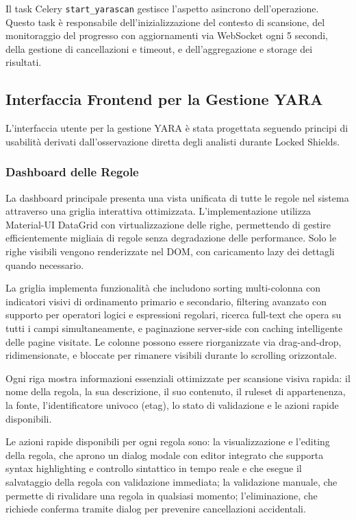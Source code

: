 Il task Celery \texttt{start\_yarascan} gestisce l'aspetto asincrono dell'operazione. Questo task è responsabile dell'inizializzazione del contesto di scansione, del monitoraggio del progresso con aggiornamenti via WebSocket ogni 5 secondi, della gestione di cancellazioni e timeout, e dell'aggregazione e storage dei risultati.

\subsection{Interfaccia Frontend per la Gestione YARA}

L'interfaccia utente per la gestione YARA è stata progettata seguendo principi di usabilità derivati dall'osservazione diretta degli analisti durante Locked Shields.

\subsubsection{Dashboard delle Regole}

La dashboard principale presenta una vista unificata di tutte le regole nel sistema attraverso una griglia interattiva ottimizzata. L'implementazione utilizza Material-UI DataGrid con virtualizzazione delle righe, permettendo di gestire efficientemente migliaia di regole senza degradazione delle performance. Solo le righe visibili vengono renderizzate nel DOM, con caricamento lazy dei dettagli quando necessario.

La griglia implementa funzionalità che includono sorting multi-colonna con indicatori visivi di ordinamento primario e secondario, filtering avanzato con supporto per operatori logici e espressioni regolari, ricerca full-text che opera su tutti i campi simultaneamente, e paginazione server-side con caching intelligente delle pagine visitate. Le colonne possono essere riorganizzate via drag-and-drop, ridimensionate, e bloccate per rimanere visibili durante lo scrolling orizzontale.

Ogni riga mostra informazioni essenziali ottimizzate per scansione visiva rapida: il nome della regola, la sua descrizione, il suo contenuto, il ruleset di appartenenza, la fonte, l'identificatore univoco (etag), lo stato di validazione e le azioni rapide disponibili.

Le azioni rapide disponibili per ogni regola sono: la visualizzazione e l'editing della regola, che aprono un dialog modale con editor integrato che supporta syntax highlighting e controllo sintattico in tempo reale e che esegue il salvataggio della regola con validazione immediata; la validazione manuale, che permette di rivalidare una regola in qualsiasi momento; l'eliminazione, che richiede conferma tramite dialog per prevenire cancellazioni accidentali.

